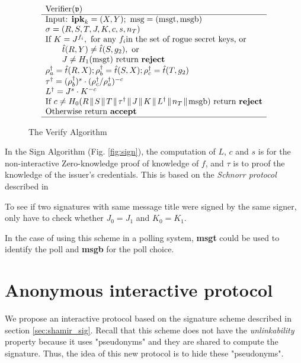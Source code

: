 \begin{figure}[H]
$$\begin{array}{l}
\text{Verifier}(\mathfrak{v}) \\
\hline
\text{Input: \textbf{ipk}}_k = (X,Y); \ \text{msg} = (\text{msgt}, \text{msgb}) \\
\sigma = (R,S,T,J,K,c,s,n_T) \\
\text{If } K = J^{f_i}, \text{ for any } f_i \text{in the set of rogue secret keys, or} \\
\qquad \hat{t}(R,Y) \neq \hat{t}(S,g_2), \text{ or} \\
\qquad J \neq H_1(\text{msgt}) \text{ return \textbf{reject}} \\
\rho_a^\dagger = \hat{t}(R,X); \rho_b^\dagger = \hat{t}(S,X); \rho_c^\dagger = \hat{t}(T,g_2) \\
\tau^\dagger = (\rho_b^\dagger)^s \cdot (\rho_c^\dagger / \rho_a^\dagger)^{-c} \\
L^\dagger = J^s \cdot K^{-c} \\
\text{If } c \neq H_0 (R \con S \con T \con \tau^\dagger \con J \con K \con L^\dagger \con n_T \con \text{msgb}) \text{ return \textbf{reject}} \\
\text{Otherwise return \textbf{accept}} \\
\hline
\end{array}
$$
\caption{The Verify Algorithm}
\label{fig:verify}
\end{figure}

In the Sign Algorithm (Fig. \ref{fig:sign}), the computation of $L$, $c$ and $s$ is for the non-interactive Zero-knowledge proof of knowledge of $f$, and $\tau$ is to proof the knowledge of the issuer's credentials. This is based on the \textit{Schnorr protocol} described in \cite{Schnorr90}

To see if two signatures with same message title were signed by the same signer, only have to check whether $J_0 = J_1$ and $K_0 = K_1$.

In the case of using this scheme in a polling system, \textbf{msgt} could be used to identify the poll and \textbf{msgb} for the poll choice.

\section{Anonymous interactive protocol}

We propose an interactive protocol based on the signature scheme described in section \ref{sec:shamir_sig}. Recall that this scheme does not have the \textit{unlinkability} property because it uses "pseudonyms" and they are shared to compute the signature. Thus, the idea of this new protocol is to hide these "pseudonyms".

